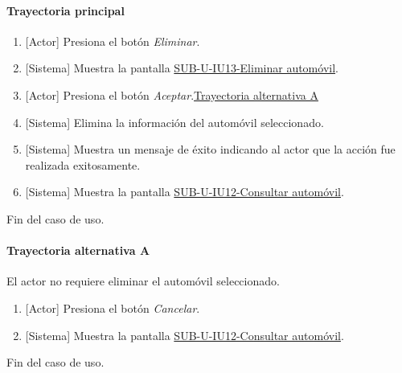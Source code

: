 \paragraph{Trayectoria principal}
	\begin{enumerate}
		\item {[Actor]} Presiona el botón \textit{Eliminar}.
		\item {[Sistema]} Muestra la pantalla \hyperref[fig:sub-u-iu13]{SUB-U-IU13-Eliminar automóvil}.
		\item {[Actor]} Presiona el botón \textit{Aceptar}.\hyperref[SUB-U-CU13:TA]{Trayectoria alternativa A}
		\item {[Sistema]} Elimina la información del automóvil seleccionado.
		\item {[Sistema]} Muestra un mensaje de éxito indicando al actor que la acción fue realizada exitosamente.
		\item \label{SUB-U-CU13:Pantalla} {[Sistema]} Muestra la pantalla \hyperref[fig:sub-u-iu12]{SUB-U-IU12-Consultar automóvil}.
	\end{enumerate}
	Fin del caso de uso.

\paragraph{Trayectoria alternativa A} \label{SUB-U-CU13:TA}
	El actor no requiere eliminar el automóvil seleccionado.
	\begin{enumerate}[label=A\arabic*.]
		\item {[Actor]} Presiona el botón \textit{Cancelar}.
		\item {[Sistema]} Muestra la pantalla \hyperref[fig:sub-u-iu12]{SUB-U-IU12-Consultar automóvil}.
	\end{enumerate}
	Fin del caso de uso.
